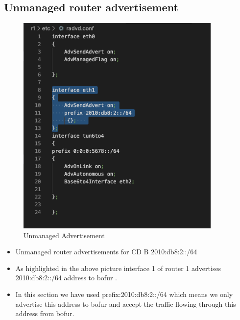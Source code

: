 \subsection{Unmanaged router advertisement}
\begin{figure}[H]
\centering
  \includegraphics[width=0.9\textwidth]{images/unmanged router advertisement.png}
  \caption{Unmanaged Advertisement}
  \label{fig:2.3 }
  \end{figure}
 \begin{itemize}
\item Unmanaged router advertisements for CD B 2010:db8:2::/64
\item As highlighted in the above picture interface 1 of router 1 advertises 2010:db8:2::/64 address to bofur .
\item In this section we have used prefix:2010:db8:2::/64 which means we only advertise this address to bofur and accept the traffic flowing through this address from bofur.
\end{itemize}

